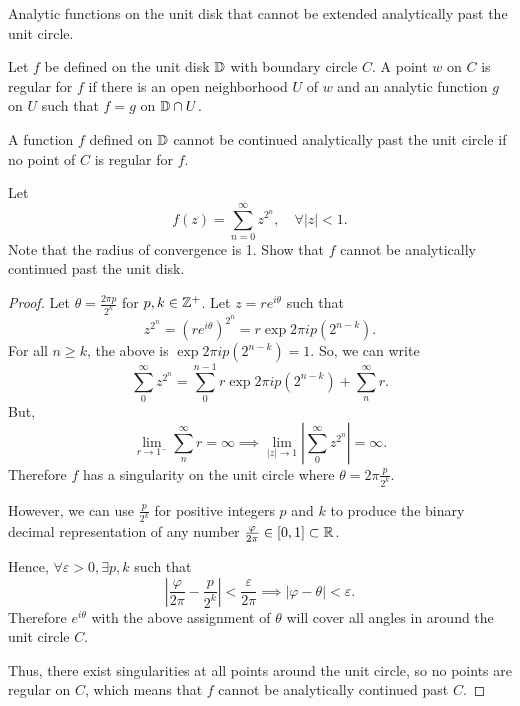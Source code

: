 \documentclass[../hw2]{subfiles}
\begin{document}
\begin{problem}
Analytic functions on the unit disk that cannot be extended analytically past the unit circle.
\begin{definition}[regular]
	Let $f$ be defined on the unit disk  $\mathbb{D}$ with boundary circle $C$.
	A point $w$ on $C$ is regular for $f$ if there is an open neighborhood $U$ of $w$
	and an analytic function $g$ on $U$ such that $f=g$ on $\mathbb{D}\cap U$.
\end{definition}
\begin{lemma}
	A function $f$ defined on $\mathbb{D}$ cannot be continued analytically past the unit circle if no point of $C$ is regular for $f$.
\end{lemma}
Let  \[
	f(z)=\sum_{n=0}^{\infty} z^{2^{n}}, \quad \forall |z|<1
	.\]
Note that the radius of convergence is 1.
Show that $f$ cannot be analytically continued past the unit disk.
\end{problem}
\begin{proof}
	\let\epsilon\varepsilon
	Let $\theta=\frac{2\pi p}{2^k}$ for $p,k \in \mathbb{Z}^+$.
	Let $z=re^{i\theta}$ such that \[
		z^{2^n} = \left( re^{i\theta} \right)^{2^n} = r\exp{2\pi i p (2^{n-k})}
		.\]
	For all $n\ge k$, the above is $\exp{2\pi i p (2^{n-k})}=1$.
	So, we can write \[
		\sum_{0}^{\infty} z^{2^n} = \sum_{0}^{n-1} r\exp{2\pi i p (2^{n-k})} + \sum_{n}^{\infty} r
		.\]
	But, \[
		\lim_{r \to 1^-} \sum_{n}^{\infty} r = \infty \implies \lim_{|z| \to 1} \left| \sum_{0}^{\infty} z^{2^n} \right| = \infty
		.\]
	Therefore $f$ has a singularity on the unit circle where  $\theta=2\pi \frac{p}{2^k}$.

	However, we can use $\frac{p}{2^k}$ for positive integers $p$ and $k$ to produce the binary decimal representation of any number $\frac{\varphi}{2\pi} \in  [0,1] \subset \mathbb{R}$.

	Hence, $\forall \epsilon>0, \exists p, k $ such that \[
		\left|  \frac{\varphi}{2\pi}- \frac{p}{2^k}\right| < \frac{\epsilon}{2\pi}
		\implies |\varphi-\theta| < \epsilon
		.\]
	Therefore $e^{i\theta}$ with the above assignment of $\theta$ will cover all angles in around the unit circle $C$.

	Thus, there exist singularities at all points around the unit circle, so no points are regular on $C$, which means that $f$ cannot be analytically continued past $C$.
\end{proof}
\end{document}
